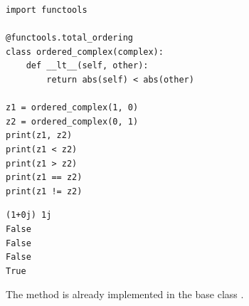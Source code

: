 \begin{frame}[fragile]
%
\begin{tcbraster}[raster columns=2,
                  raster equal height,
                  nobeforeafter,
                  raster column skip=0.2cm]
\begin{codebox}
\begin{verbatim}
import functools

@functools.total_ordering
class ordered_complex(complex):
    def __lt__(self, other):
        return abs(self) < abs(other)

z1 = ordered_complex(1, 0)
z2 = ordered_complex(0, 1)
print(z1, z2)
print(z1 < z2)
print(z1 > z2)
print(z1 == z2)
print(z1 != z2)
\end{verbatim}
\end{codebox}
%
\begin{cmdbox}[Output]
\begin{verbatim}
(1+0j) 1j
False
False
False
True
\end{verbatim}
\end{cmdbox}
\end{tcbraster}
%
\begin{hintbox}
\footnotesize
The method  is already implemented in the base class .
\end{hintbox}
%
\end{frame}


